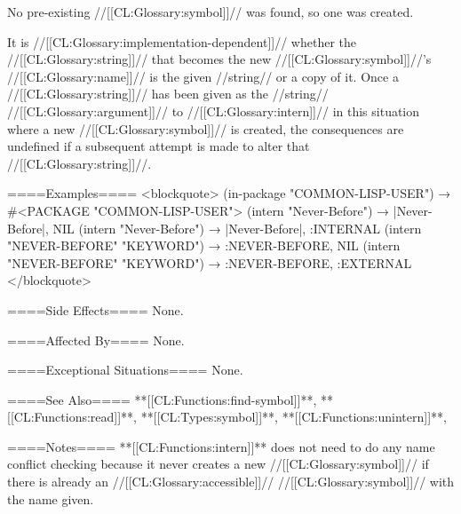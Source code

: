 No pre-existing //[[CL:Glossary:symbol]]// was found, so one was created.

It is //[[CL:Glossary:implementation-dependent]]// whether the //[[CL:Glossary:string]]// that becomes the new //[[CL:Glossary:symbol]]//'s //[[CL:Glossary:name]]// is the given //string// or a copy of it. Once a //[[CL:Glossary:string]]// has been given as the //string// //[[CL:Glossary:argument]]// to //[[CL:Glossary:intern]]// in this situation where a new //[[CL:Glossary:symbol]]// is created, the consequences are undefined if a subsequent attempt is made to alter that //[[CL:Glossary:string]]//.

\endlist

====Examples====
<blockquote> (in-package "COMMON-LISP-USER") → #<PACKAGE "COMMON-LISP-USER"> (intern "Never-Before") → |Never-Before|, NIL (intern "Never-Before") → |Never-Before|, :INTERNAL (intern "NEVER-BEFORE" "KEYWORD") → :NEVER-BEFORE, NIL (intern "NEVER-BEFORE" "KEYWORD") → :NEVER-BEFORE, :EXTERNAL </blockquote>

====Side Effects====
None.

====Affected By====
None.

====Exceptional Situations====
None.

====See Also====
**[[CL:Functions:find-symbol]]**, **[[CL:Functions:read]]**, **[[CL:Types:symbol]]**, **[[CL:Functions:unintern]]**, {\secref\SymbolTokens}

====Notes====
**[[CL:Functions:intern]]** does not need to do any name conflict checking because it never creates a new //[[CL:Glossary:symbol]]// if there is already an //[[CL:Glossary:accessible]]// //[[CL:Glossary:symbol]]// with the name given.

 
